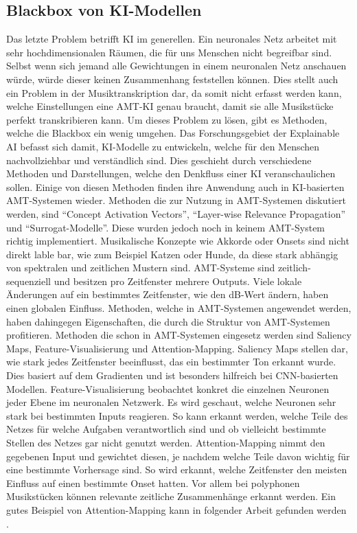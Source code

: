 \subsection{Blackbox von KI-Modellen}
Das letzte Problem betrifft KI im generellen.
Ein neuronales Netz arbeitet mit sehr hochdimensionalen Räumen, die für uns Menschen nicht begreifbar sind.
Selbst wenn sich jemand alle Gewichtungen in einem neuronalen Netz anschauen würde,
würde dieser keinen Zusammenhang feststellen können.
Dies stellt auch ein Problem in der Musiktranskription dar, da somit nicht erfasst werden kann,
welche Einstellungen eine AMT-KI genau braucht,
damit sie alle Musikstücke perfekt transkribieren kann.
Um dieses Problem zu lösen, gibt es Methoden, welche die Blackbox ein wenig umgehen.
Das Forschungsgebiet der Explainable AI befasst sich damit,
KI-Modelle zu entwickeln, welche für den Menschen nachvollziehbar und verständlich sind.
Dies geschieht durch verschiedene Methoden und Darstellungen, welche den Denkfluss einer KI veranschaulichen sollen.
Einige von diesen Methoden finden ihre Anwendung auch in KI-basierten AMT-Systemen wieder.
Methoden die zur Nutzung in AMT-Systemen diskutiert werden, sind \enquote{Concept Activation Vectors},
\enquote{Layer-wise Relevance Propagation} und \enquote{Surrogat-Modelle}.
Diese wurden jedoch noch in keinem AMT-System richtig implementiert.
Musikalische Konzepte wie Akkorde oder Onsets sind nicht direkt lable bar, wie zum Beispiel Katzen oder Hunde,
da diese stark abhängig von spektralen und zeitlichen Mustern sind.
AMT-Systeme sind zeitlich-sequenziell und besitzen pro Zeitfenster mehrere Outputs.
Viele lokale Änderungen auf ein bestimmtes Zeitfenster, wie den dB-Wert ändern, haben einen globalen Einfluss.
Methoden, welche in AMT-Systemen angewendet werden,
haben dahingegen Eigenschaften, die durch die Struktur von AMT-Systemen profitieren.
Methoden die schon in AMT-Systemen eingesetz werden sind Saliency Maps, Feature-Visualisierung und Attention-Mapping.
Saliency Maps stellen dar, wie stark jedes Zeitfenster beeinflusst, das ein bestimmter Ton erkannt wurde.
Dies basiert auf dem Gradienten und ist besonders hilfreich bei CNN-basierten Modellen.
Feature-Visualisierung beobachtet konkret die einzelnen Neuronen jeder Ebene im neuronalen Netzwerk.
Es wird geschaut, welche Neuronen sehr stark bei bestimmten Inputs reagieren.
So kann erkannt werden, welche Teile des Netzes für welche Aufgaben verantwortlich sind
und ob vielleicht bestimmte Stellen des Netzes gar nicht genutzt werden.
Attention-Mapping nimmt den gegebenen Input und gewichtet diesen,
je nachdem welche Teile davon wichtig für eine bestimmte Vorhersage sind.
So wird erkannt, welche Zeitfenster den meisten Einfluss auf einen bestimmte Onset hatten.
Vor allem bei polyphonen Musikstücken können relevante zeitliche Zusammenhänge erkannt werden.
Ein gutes Beispiel von Attention-Mapping kann in folgender Arbeit gefunden werden \cite{cheuk2021revisiting}.
